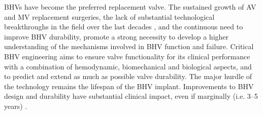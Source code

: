     
    BHVs have become the preferred replacement valve. The sustained growth of AV and MV replacement surgeries, the lack of substantial technological breakthroughs in the field over the last decades \cite{soares_biomechanical_2016}, and the continuous need to improve BHV durability, promote a strong necessity to develop a higher understanding of the mechanisms involved in BHV function and failure.  Critical BHV engineering aims to ensure valve functionality for its clinical performance with a combination of hemodynamic, biomechanical and biological aspects, and to predict and extend as much as possible valve durability. The major hurdle of the technology remains the lifespan of the BHV implant. Improvements to BHV design and durability have substantial clinical impact, even if marginally (i.e. 3–5 years) \cite{jamieson_carpentier_1998}.
    